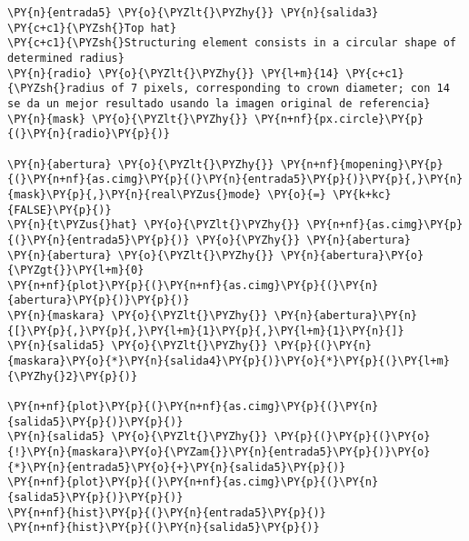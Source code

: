     \begin{tcolorbox}[breakable, size=fbox, boxrule=1pt, pad at break*=1mm,colback=cellbackground, colframe=cellborder]
\begin{Verbatim}[commandchars=\\\{\}]
\PY{n}{entrada5} \PY{o}{\PYZlt{}\PYZhy{}} \PY{n}{salida3}
\PY{c+c1}{\PYZsh{}Top hat}
\PY{c+c1}{\PYZsh{}Structuring element consists in a circular shape of determined radius}
\PY{n}{radio} \PY{o}{\PYZlt{}\PYZhy{}} \PY{l+m}{14} \PY{c+c1}{\PYZsh{}radius of 7 pixels, corresponding to crown diameter; con 14 se da un mejor resultado usando la imagen original de referencia}
\PY{n}{mask} \PY{o}{\PYZlt{}\PYZhy{}} \PY{n+nf}{px.circle}\PY{p}{(}\PY{n}{radio}\PY{p}{)}

\PY{n}{abertura} \PY{o}{\PYZlt{}\PYZhy{}} \PY{n+nf}{mopening}\PY{p}{(}\PY{n+nf}{as.cimg}\PY{p}{(}\PY{n}{entrada5}\PY{p}{)}\PY{p}{,}\PY{n}{mask}\PY{p}{,}\PY{n}{real\PYZus{}mode} \PY{o}{=} \PY{k+kc}{FALSE}\PY{p}{)}
\PY{n}{t\PYZus{}hat} \PY{o}{\PYZlt{}\PYZhy{}} \PY{n+nf}{as.cimg}\PY{p}{(}\PY{n}{entrada5}\PY{p}{)} \PY{o}{\PYZhy{}} \PY{n}{abertura}
\PY{n}{abertura} \PY{o}{\PYZlt{}\PYZhy{}} \PY{n}{abertura}\PY{o}{\PYZgt{}}\PY{l+m}{0}
\PY{n+nf}{plot}\PY{p}{(}\PY{n+nf}{as.cimg}\PY{p}{(}\PY{n}{abertura}\PY{p}{)}\PY{p}{)}
\PY{n}{maskara} \PY{o}{\PYZlt{}\PYZhy{}} \PY{n}{abertura}\PY{n}{[}\PY{p}{,}\PY{p}{,}\PY{l+m}{1}\PY{p}{,}\PY{l+m}{1}\PY{n}{]}
\PY{n}{salida5} \PY{o}{\PYZlt{}\PYZhy{}} \PY{p}{(}\PY{n}{maskara}\PY{o}{*}\PY{n}{salida4}\PY{p}{)}\PY{o}{*}\PY{p}{(}\PY{l+m}{\PYZhy{}2}\PY{p}{)}

\PY{n+nf}{plot}\PY{p}{(}\PY{n+nf}{as.cimg}\PY{p}{(}\PY{n}{salida5}\PY{p}{)}\PY{p}{)}
\PY{n}{salida5} \PY{o}{\PYZlt{}\PYZhy{}} \PY{p}{(}\PY{p}{(}\PY{o}{!}\PY{n}{maskara}\PY{o}{\PYZam{}}\PY{n}{entrada5}\PY{p}{)}\PY{o}{*}\PY{n}{entrada5}\PY{o}{+}\PY{n}{salida5}\PY{p}{)}
\PY{n+nf}{plot}\PY{p}{(}\PY{n+nf}{as.cimg}\PY{p}{(}\PY{n}{salida5}\PY{p}{)}\PY{p}{)}
\PY{n+nf}{hist}\PY{p}{(}\PY{n}{entrada5}\PY{p}{)}
\PY{n+nf}{hist}\PY{p}{(}\PY{n}{salida5}\PY{p}{)}
\end{Verbatim}
\end{tcolorbox}

    \begin{center}
    \end{center}
    { \hspace*{\fill} \\}
    
    \begin{center}
    \end{center}
    { \hspace*{\fill} \\}
    
